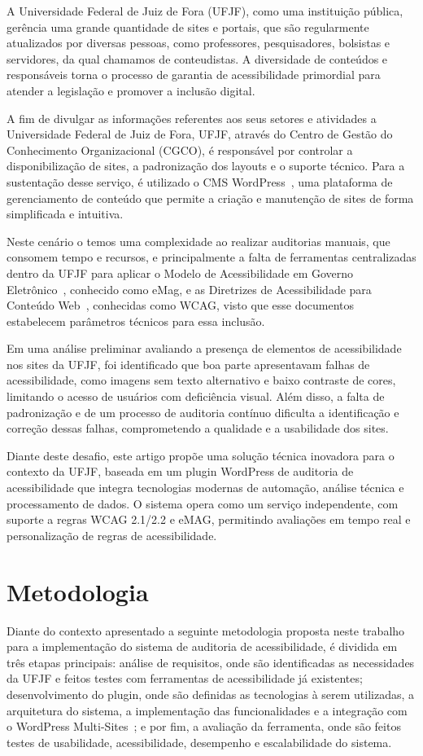 \documentclass[12pt]{article}
\begin{document}
A Universidade Federal de Juiz de Fora (UFJF), como uma instituição pública,
gerência uma grande quantidade de sites e portais, que são regularmente
atualizados por diversas pessoas, como professores, pesquisadores, bolsistas e
servidores, da qual chamamos de conteudistas. A diversidade de conteúdos e
responsáveis torna o processo de garantia de acessibilidade primordial para
atender a legislação e promover a inclusão digital.

A fim de divulgar as informações referentes aos seus setores e atividades a
Universidade Federal de Juiz de Fora, UFJF, através do Centro de Gestão
do Conhecimento Organizacional (CGCO), é responsável por controlar a
disponibilização de sites, a padronização dos layouts e o suporte técnico. Para
a sustentação desse serviço, é utilizado o CMS WordPress~\autocite{WP},
uma plataforma de gerenciamento de conteúdo que permite a criação e
manutenção de sites de forma simplificada e intuitiva.

Neste cenário o temos uma complexidade ao realizar auditorias manuais, que
consomem tempo e recursos, e principalmente a falta de ferramentas
centralizadas dentro da UFJF para aplicar o Modelo de Acessibilidade em
Governo Eletrônico~\cite{emag}, conhecido como eMag, e as Diretrizes
de Acessibilidade para Conteúdo Web~\cite{wcag22}, conhecidas como
WCAG, visto que esse documentos estabelecem parâmetros técnicos para essa inclusão.

Em uma análise preliminar avaliando a presença de elementos de acessibilidade nos
sites da UFJF, foi identificado que boa parte apresentavam falhas de acessibilidade, como imagens sem texto
alternativo e baixo contraste de cores, limitando o acesso de usuários com deficiência
visual. Além disso, a falta de padronização e de um processo de auditoria contínuo
dificulta a identificação e correção dessas falhas, comprometendo a qualidade e a
usabilidade dos sites.

Diante deste desafio, este artigo propõe uma solução técnica inovadora
para o contexto da UFJF, baseada em um plugin WordPress de auditoria
de acessibilidade que integra tecnologias modernas de automação,
análise técnica e processamento de dados. O sistema opera como um serviço
independente, com suporte a regras WCAG 2.1/2.2 e eMAG, permitindo
avaliações em tempo real e personalização de regras de acessibilidade.

\section{Metodologia}\label{sec:metodologia}
Diante do contexto apresentado a seguinte metodologia proposta neste trabalho
para a implementação do sistema de auditoria de acessibilidade, é dividida
em três etapas principais: análise de requisitos, onde são identificadas as
necessidades da UFJF e feitos testes com ferramentas de acessibilidade já
existentes; desenvolvimento do plugin, onde são definidas as tecnologias à serem
utilizadas, a arquitetura do sistema, a implementação das funcionalidades e a
integração com o WordPress Multi-Sites~\autocite{wp-ms}; e por fim, 
a avaliação da ferramenta,
onde são feitos testes de usabilidade, acessibilidade, desempenho e 
escalabilidade do sistema.
\end{document}
